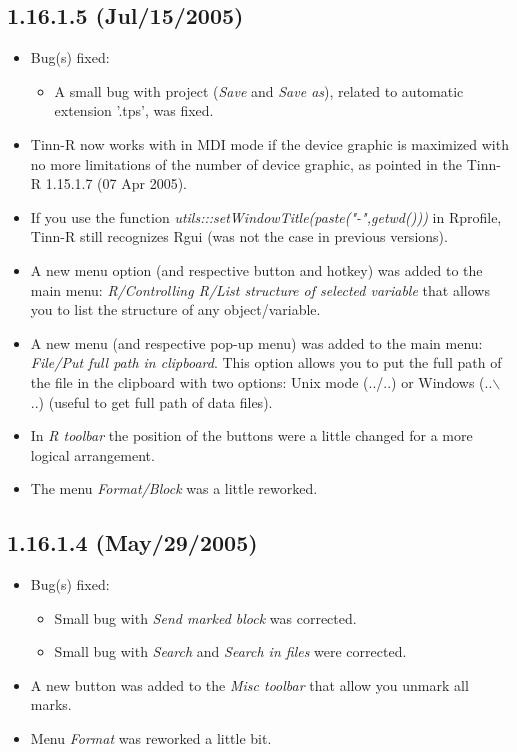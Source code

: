 \subsection*{1.16.1.5 (Jul/15/2005)}
\begin{itemize}
  \item Bug(s) fixed:
    \begin{itemize}
      \item A small bug with project (\textit{Save} and \textit{Save as}),
        related to automatic extension '.tps', was fixed.
    \end{itemize}
  \item Tinn-R now works with \RR{} in MDI mode if the device graphic is
    maximized with no more limitations of the number of device graphic,
    as pointed in the Tinn-R 1.15.1.7 (07 Apr 2005).
  \item If you use the function \textit{utils:::setWindowTitle(paste("-",getwd()))}
    in Rprofile, Tinn-R still recognizes Rgui (was not the case in
    previous versions).
  \item A new menu option (and respective button and hotkey) was added to
    the main menu: \textit{R/Controlling R/List structure of selected variable}
    that allows you to list the structure of any \RR{} object/variable.
  \item A new menu (and respective pop-up menu) was added to the main menu:
    \textit{File/Put full path in clipboard}. This option allows you to
    put the full path of the file in the clipboard with two options: Unix
    mode (../..) or Windows (..$\backslash$..) (useful to get full path
    of data files).
  \item In \textit{R toolbar} the position of the buttons were a little changed
    for a more logical arrangement.
  \item The menu \textit{Format/Block} was a little reworked.
\end{itemize}


\subsection*{1.16.1.4 (May/29/2005)}
\begin{itemize}
  \item Bug(s) fixed:
    \begin{itemize}
      \item Small bug with \textit{Send marked block} was corrected.
      \item Small bug with \textit{Search} and \textit{Search in files}
        were corrected.
    \end{itemize}
  \item A new button was added to the \textit{Misc toolbar} that allow
    you unmark all marks.
  \item Menu \textit{Format}  was reworked a little bit.
\end{itemize}


